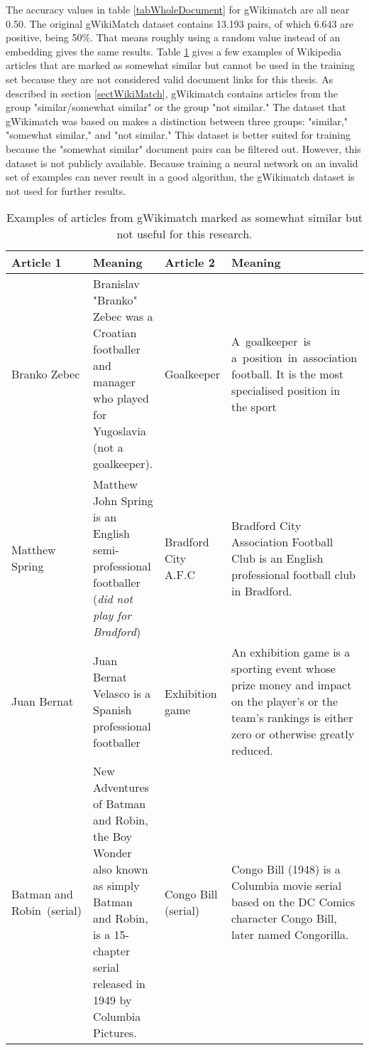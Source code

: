 The accuracy values in table \ref{tabWholeDocument} for gWikimatch are all near 0.50. The original gWikiMatch dataset contains 13.193 pairs, of which 6.643 are positive, being 50\%. That means roughly using a random value instead of an embedding gives the same results. Table \ref{tabSomewhatSimilar} gives a few examples of Wikipedia articles that are marked as somewhat similar but cannot be used in the training set because they are not considered valid document links for this thesis. As described in section \ref{sectWikiMatch}, gWikimatch contains articles from the group "similar/somewhat similar" or the group "not similar." The dataset that gWikimatch was based on makes a distinction between three groups: "similar," "somewhat similar," and "not similar."  This dataset is better suited for training because the "somewhat similar" document pairs can be filtered out. However, this dataset is not publicly available. Because training a neural network on an invalid set of examples can never result in a good algorithm, the gWikimatch dataset is not used for further results. \\

\begin{table}[!ht]
    \centering
    \captionsetup{justification=centering}
    \begin{tabular}{p{2.25cm}|p{4.75cm}|p{2.25cm}|p{4.75cm}}
    \hline
        \textbf{Article 1} & \textbf{Meaning} & \textbf{Article 2} & \textbf{Meaning} \\ \hline
        Branko Zebec & Branislav "Branko" Zebec was a Croatian footballer and manager who played for Yugoslavia (not a goalkeeper).    & Goalkeeper & A goalkeeper is a position in association football. It is the most specialised position in the sport  \\ \hline
        Matthew Spring & Matthew John Spring is an English semi-professional footballer (\textit{did not play for Bradford}) & Bradford City A.F.C & Bradford City Association Football Club is an English professional football club in Bradford.  \\ \hline
        Juan Bernat & Juan Bernat Velasco is a Spanish professional footballer  & Exhibition game & An exhibition game is a sporting event whose prize money and impact on the player's or the team's rankings is either zero or otherwise greatly reduced.  \\ \hline
        Batman and Robin (serial) & New Adventures of Batman and Robin, the Boy Wonder also known as simply Batman and Robin, is a 15-chapter serial released in 1949 by Columbia Pictures. & Congo Bill (serial) & Congo Bill (1948) is a Columbia movie serial based on the DC Comics character Congo Bill, later named Congorilla. \\ \hline
    \end{tabular}
    \caption{Examples of articles from gWikimatch marked as somewhat similar but not useful for this research.}
    \label{tabSomewhatSimilar}
\end{table}
\\
